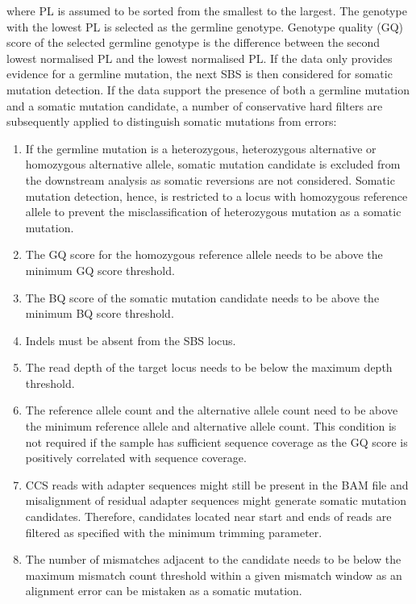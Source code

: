 where PL is assumed to be sorted from the smallest to the largest. The genotype with the lowest PL is selected as the germline genotype. Genotype quality (GQ) score of the selected germline genotype is the difference between the second lowest normalised PL and the lowest normalised PL. If the data only provides evidence for a germline mutation, the next SBS is then considered for somatic mutation detection. If the data support the presence of both a germline mutation and a somatic mutation candidate, a number of conservative hard filters are subsequently applied to distinguish somatic mutations from errors:

\begin{enumerate}
\item If the germline mutation is a heterozygous, heterozygous alternative or homozygous alternative allele, somatic mutation candidate is excluded from the downstream analysis as somatic reversions are not considered. Somatic mutation detection, hence, is restricted to a locus with homozygous reference allele to prevent the misclassification of heterozygous mutation as a somatic mutation.
\item The GQ score for the homozygous reference allele needs to be above the minimum GQ score threshold.
\item The BQ score of the somatic mutation candidate needs to be above the minimum BQ score threshold.
\item Indels must be absent from the SBS locus.
\item The read depth of the target locus needs to be below the maximum depth threshold.
\item The reference allele count and the alternative allele count need to be above the minimum reference allele and alternative allele count. This condition is not required if the sample has sufficient sequence coverage as the GQ score is positively correlated with sequence coverage.
\item CCS reads with adapter sequences might still be present in the BAM file and misalignment of residual adapter sequences might generate somatic mutation candidates. Therefore, candidates located near start and ends of reads are filtered as specified with the minimum trimming parameter.  
\item The number of mismatches adjacent to the candidate needs to be below the maximum mismatch count threshold within a given mismatch window as an alignment error can be mistaken as a somatic mutation.  
\end{enumerate}

